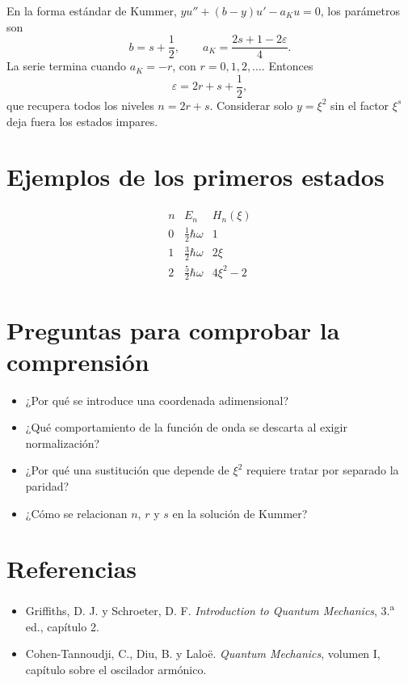 \documentclass[12pt]{article}
\begin{document}
En la forma estándar de Kummer,
\(yu''+(b-y)u'-a_Ku=0\), los parámetros son
\[
b=s+\frac{1}{2},
\qquad
a_K=\frac{2s+1-2\varepsilon}{4}.
\]
La serie termina cuando \(a_K=-r\), con \(r=0,1,2,\ldots\). Entonces
\[
\varepsilon=2r+s+\frac{1}{2},
\]
que recupera todos los niveles \(n=2r+s\). Considerar solo \(y=\xi^2\) sin el
factor \(\xi^s\) deja fuera los estados impares.

\section{Ejemplos de los primeros estados}

\[
\begin{array}{c|c|c}
n & E_n & H_n(\xi) \\ \hline
0 & \frac{1}{2}\hbar\omega & 1 \\
1 & \frac{3}{2}\hbar\omega & 2\xi \\
2 & \frac{5}{2}\hbar\omega & 4\xi^2-2
\end{array}
\]

\section{Preguntas para comprobar la comprensión}

\begin{itemize}
  \item ¿Por qué se introduce una coordenada adimensional?
  \item ¿Qué comportamiento de la función de onda se descarta al exigir
        normalización?
  \item ¿Por qué una sustitución que depende de \(\xi^2\) requiere tratar por
        separado la paridad?
  \item ¿Cómo se relacionan \(n\), \(r\) y \(s\) en la solución de Kummer?
\end{itemize}

\section{Referencias}

\begin{itemize}
  \item Griffiths, D. J. y Schroeter, D. F.
        \emph{Introduction to Quantum Mechanics}, 3.\textsuperscript{a} ed.,
        capítulo 2.
  \item Cohen-Tannoudji, C., Diu, B. y Laloë.
        \emph{Quantum Mechanics}, volumen I, capítulo sobre el oscilador
        armónico.
\end{itemize}
\end{document}

